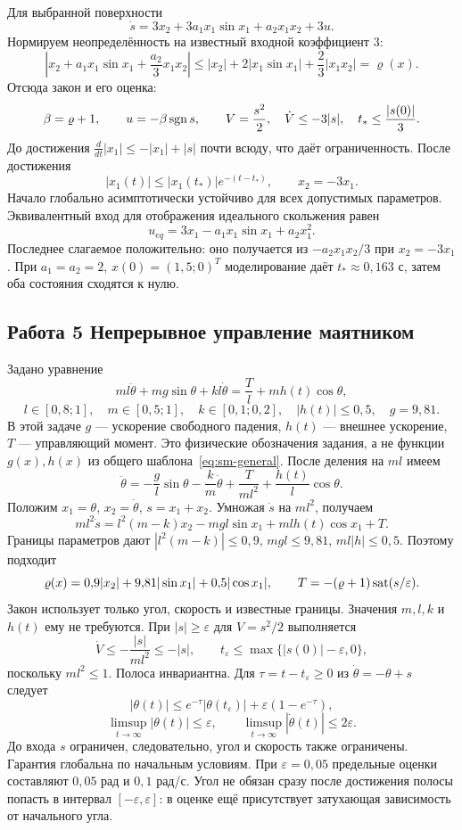 Для выбранной поверхности
\[
 \dot s=3x_2+3a_1x_1\sin x_1+a_2x_1x_2+3u.
\]
Нормируем неопределённость на известный входной коэффициент $3$:
\[
 \left|x_2+a_1x_1\sin x_1+\frac{a_2}{3}x_1x_2\right|
 \le|x_2|+2|x_1\sin x_1|+\frac23|x_1x_2|=\varrho(x).
\]
Отсюда закон и его оценка:
\[
 \beta=\varrho+1,\qquad u=-\beta\operatorname{sgn} s,\qquad
 V=\frac{s^2}{2},\quad \dot V\le-3|s|,\quad
 t_*\le\frac{|s(0)|}{3}.
\]
До достижения $\frac{d}{dt}|x_1|\le-|x_1|+|s|$ почти всюду,
что даёт ограниченность. После достижения
\[
 |x_1(t)|\le|x_1(t_*)|e^{-(t-t_*)},\qquad x_2=-3x_1.
\]
Начало глобально асимптотически устойчиво для всех допустимых параметров.
Эквивалентный вход для отображения идеального скольжения равен
\[
 u_{eq}=3x_1-a_1x_1\sin x_1+a_2x_1^2.
\]
Последнее слагаемое положительно: оно получается из
$-a_2x_1x_2/3$ при $x_2=-3x_1$.
При $a_1=a_2=2$, $x(0)=(1{,}5;0)^T$ моделирование даёт
$t_*\approx0{,}163$ с, затем оба состояния сходятся к нулю.

\subsection{Работа 5 Непрерывное управление маятником}
\addition Задано уравнение
\[
 ml\ddot\theta+mg\sin\theta+kl\dot\theta
 =\frac{T}{l}+mh(t)\cos\theta,
\]
\[
 l\in[0{,}8;1],\quad m\in[0{,}5;1],\quad
 k\in[0{,}1;0{,}2],\quad |h(t)|\le0{,}5,\quad g=9{,}81.
\]
В этой задаче $g$ --- ускорение свободного падения, $h(t)$ --- внешнее
ускорение, $T$ --- управляющий момент. Это физические обозначения задания,
а не функции $g(x),h(x)$ из общего шаблона~\eqref{eq:sm-general}.
После деления на $ml$ имеем
\[
 \ddot\theta=-\frac gl\sin\theta-\frac km\dot\theta
             +\frac{T}{ml^2}+\frac{h(t)}l\cos\theta.
\]
Положим $x_1=\theta$, $x_2=\dot\theta$, $s=x_1+x_2$.
Умножая $\dot s$ на $ml^2$, получаем
\[
 ml^2\dot s=l^2(m-k)x_2-mgl\sin x_1+mlh(t)\cos x_1+T.
\]
Границы параметров дают $|l^2(m-k)|\le0{,}9$, $mgl\le9{,}81$,
$ml|h|\le0{,}5$. Поэтому подходит
\begin{equation}
 \varrho(x)=0{,}9|x_2|+9{,}81|\sin x_1|+0{,}5|\cos x_1|,
 \qquad T=-(\varrho+1)\operatorname{sat}(s/\varepsilon).
 \label{eq:pendulum-sat}
\end{equation}
Закон использует только угол, скорость и известные границы. Значения
$m,l,k$ и $h(t)$ ему не требуются.
При $|s|\ge\varepsilon$ для $V=s^2/2$ выполняется
\[
 \dot V\le-\frac{|s|}{ml^2}\le-|s|,
 \qquad t_\varepsilon\le\max\{|s(0)|-\varepsilon,0\},
\]
поскольку $ml^2\le1$. Полоса инвариантна. Для
$\tau=t-t_\varepsilon\ge0$ из $\dot\theta=-\theta+s$ следует
\[
 |\theta(t)|\le e^{-\tau}|\theta(t_\varepsilon)|
 +\varepsilon(1-e^{-\tau}),
\]
\[
 \limsup_{t\to\infty}|\theta(t)|\le\varepsilon,\qquad
 \limsup_{t\to\infty}|\dot\theta(t)|\le2\varepsilon.
\]
До входа $s$ ограничен, следовательно, угол и скорость также ограничены.
Гарантия глобальна по начальным условиям. При $\varepsilon=0{,}05$
предельные оценки составляют $0{,}05$ рад и $0{,}1$ рад/с.
Угол не обязан сразу после достижения полосы попасть в интервал
$[-\varepsilon,\varepsilon]$: в оценке ещё присутствует затухающая
зависимость от начального угла.

